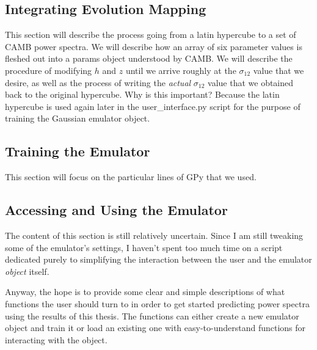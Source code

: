 \documentclass[11pt]{article}
\begin{document}
\begin{centering}
\subsection{Integrating Evolution Mapping}
\end{centering}


This section will describe the process going from a latin hypercube to a set of CAMB power spectra. We will describe how an array of six parameter values is fleshed out into a params object understood by CAMB. We will describe the procedure of modifying $h$ and $z$ until we arrive roughly at the $\sigma_{12}$ value that we desire, as well as the process of writing the \textit{actual} $\sigma_{12}$ value that we obtained back to the original hypercube. Why is this important? Because the latin hypercube is used again later in the user\_interface.py script for the purpose of training the Gaussian emulator object.

\begin{centering}
\subsection{Training the Emulator}
\label{sec: emu_training}
\end{centering}


This section will focus on the particular lines of GPy that we used.

\begin{centering}
\subsection{Accessing and Using the Emulator}
\end{centering}


The content of this section is still relatively uncertain. Since I am still tweaking some of the emulator's settings, I haven't spent too much time on a script dedicated purely to simplifying the interaction between the user and the emulator \textit{object} itself.

Anyway, the hope is to provide some clear and simple descriptions of what functions the user should turn to in order to get started predicting power spectra using the results of this thesis. The functions can either create a new emulator object and train it or load an existing one with easy-to-understand functions for interacting with the object.
\end{document}
